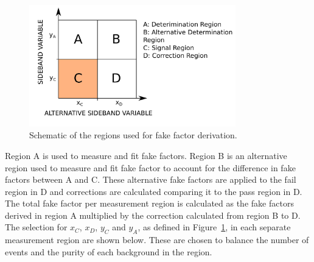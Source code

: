 \begin{figure}[!hbtp]
\centering
    \includegraphics[width=0.8\textwidth]{Figures/ff_diagram_v2.pdf}
\caption{Schematic of the regions used for fake factor derivation.}
\label{fig:ff_schematic}
\end{figure}

Region A is used to measure and fit fake factors.
Region B is an alternative region used to measure and fit fake factor to account for the difference in fake factors between A and C.
These alternative fake factors are applied to the fail region in D and corrections are calculated comparing it to the pass region in D.
The total fake factor per measurement region is calculated as the fake factors derived in region A multiplied by the correction calculated from region B to D. \\

The selection for $x_C$, $x_D$, $y_C$ and $y_A$, as defined in Figure~\ref{fig:ff_schematic}, in each separate measurement region are shown below.
These are chosen to balance the number of events and the purity of each background in the region.

